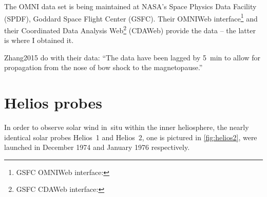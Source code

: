 The OMNI data set is being maintained at NASA's Space Physics Data Facility (SPDF), Goddard Space Flight Center (GSFC). Their OMNIWeb interface\footnote{GSFC OMNIWeb interface: } and their Coordinated Data Analysis Web\footnote{GSFC CDAWeb interface: } (CDAWeb) provide the data -- the latter is where I obtained it.


Zhang2015 do with their data: ``The data have been lagged by 5~min to allow for propagation from the nose of bow shock to the magnetopause.''\\


\section{Helios probes}
\label{sec:helios_probes}
In order to observe solar wind in~situ within the inner heliosphere, the nearly identical solar probes Helios~1 and Helios~2, one is pictured in \autoref{fig:helios2}, were launched in December 1974 and January 1976 respectively.
